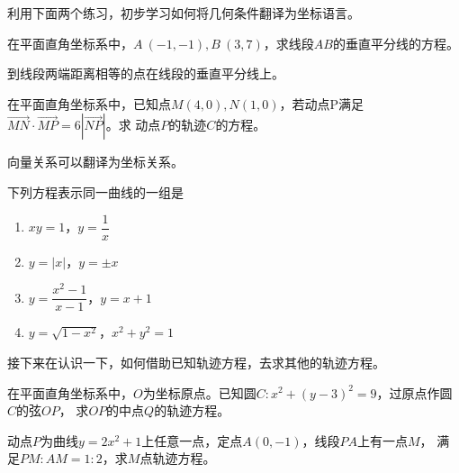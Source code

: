 利用下面两个练习，初步学习如何将几何条件翻译为坐标语言。
\begin{exercise}
    在平面直角坐标系中，\(A\ (-1,-1),B\ (3,7)\)，求线段\(AB\)的垂直平分线的方程。
\end{exercise}
\begin{hint}
    到线段两端距离相等的点在线段的垂直平分线上。
\end{hint}
\begin{exercise}
    在平面直角坐标系中，已知点$M(4,0),N(1,0)$，若动点P满足$\overrightarrow{MN}\cdot\overrightarrow{MP}=6|\overrightarrow{NP}|$。求
动点$P$的轨迹$C$的方程。
\end{exercise}
\begin{hint}
    向量关系可以翻译为坐标关系。
\end{hint}
\begin{exercise}
    下列方程表示同一曲线的一组是
    \begin{enumerate}[(1)]
        \setlength{\itemsep}{-\itemsep}
        \item \(xy=1\)，\(y=\dfrac{1}{x}\)
        \item \(y=|x|\)，\(y=\pm x\)
        \item \(y=\dfrac{x^2-1}{x-1}\)，\(y=x+1\)
        \item \(y=\sqrt{1-x^2}\)，\(x^2+y^2=1\)
    \end{enumerate}
\end{exercise}

接下来在认识一下，如何借助已知轨迹方程，去求其他的轨迹方程。
\begin{example}在平面直角坐标系中，\(O\)为坐标原点。已知圆$C:x^2+(y-3)^2=9$，过原点作圆$C$的弦$OP$，
求$OP$的中点$Q$的轨迹方程。
\end{example}
\begin{jie}

\end{jie}
\begin{exercise}
    动点\(P\)为曲线\(y=2x^2+1\)上任意一点，定点\(A(0,-1)\)，线段\(PA\)上有一点\(M\)，
    满足\(PM:AM=1:2\)，求\(M\)点轨迹方程。
\end{exercise}

